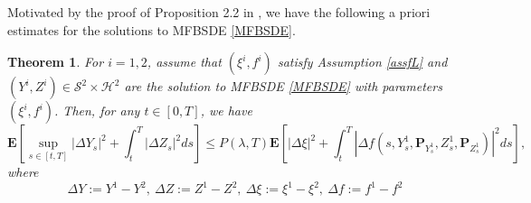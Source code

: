 \documentclass[10pt]{article}%
\numberwithin{equation}{section}
\newtheorem{theorem}{Theorem}[section]
\def \E{\mathbf{E}}
\def \P{\mathbf{P}}
\begin{document}
Motivated by the proof of Proposition 2.2 in \cite{LLZ}, we have the following a priori estimates for the solutions to MFBSDE \eqref{MFBSDE}.
\begin{theorem}\label{4-2}
 For $i=1,2$, assume that $(\xi^i,f^i)$ satisfy Assumption \ref{assfL} and $(Y^i,Z^i)\in\mathcal{S}^2\times\mathcal{H}^2$ are the solution to MFBSDE \eqref{MFBSDE} with parameters $(\xi^i,f^i)$. Then, for any $ t\in[0,T]$, we have
 \begin{equation*}
  \E\left[\sup_{s\in[t,T]}\left|\Delta Y_s\right|^2+\int_{t}^{T}\left|\Delta Z_s\right|^2 ds\right]\leq P(\lambda,T)\E\left[\left|\Delta\xi\right|^2+\int_{t}^{T}\left|\Delta f(s,Y_s^1,\P_{Y_s^1},Z_s^1,\P_{Z_s^1})\right|^2ds\right],       
 \end{equation*}
 where $$\Delta Y:=Y^1-Y^2,\ \Delta Z:=Z^1-Z^2,\ \Delta \xi:=\xi^1-\xi^2,\ \Delta f:=f^1-f^2$$
\end{theorem}
\end{document}
